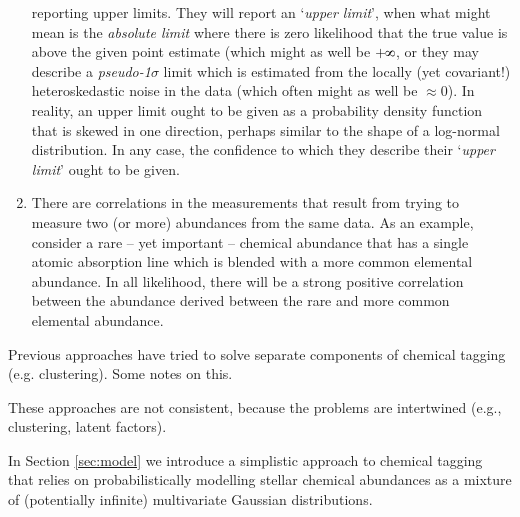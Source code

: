 \documentclass{aastex61}
\def\infinity{\rotatebox{90}{8}}
\begin{document}
\begin{enumerate}
{        reporting upper limits. They will report an `\emph{upper limit}', when
        what might mean is the \emph{absolute limit} where there is zero
        likelihood that the true value is above the given point estimate (which might as well be $+\infinity$, or
        they may describe a \emph{pseudo-1$\sigma$} limit which is estimated
        from the locally (yet covariant!) heteroskedastic noise in the data (which often might as well be $\approx$0).
        In reality, an upper limit ought to be given as a probability density
        function that is skewed in one direction, perhaps similar to the shape
        of a log-normal distribution. In any case, the confidence to which they
        describe their `\emph{upper limit}' ought to be given.}
\item There are correlations in the measurements that result from trying to
      measure two (or more) abundances from the same data. As an example,
      consider a rare -- yet important -- chemical abundance that has a single
      atomic absorption line which is blended with a more common elemental
      abundance. In all likelihood, there will be a strong positive correlation
      between the abundance derived between the rare and more common elemental
      abundance.
\end{enumerate}


Previous approaches have tried to solve separate components of chemical tagging (e.g. clustering). Some notes on this.

These approaches are not consistent, because the problems are intertwined (e.g., clustering, latent factors).






In Section \ref{sec:model} we introduce a simplistic approach to chemical
tagging that relies on probabilistically modelling stellar chemical abundances
as a mixture of (potentially infinite) multivariate Gaussian distributions.
\end{document}
